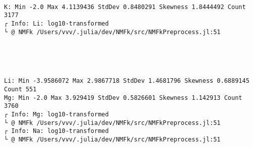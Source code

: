 \documentclass[11pt]{article}
\begin{document}
    \begin{center}
    \end{center}
    { \hspace*{\fill} \\}
    
    \begin{Verbatim}[commandchars=\\\{\}]
K: Min -2.0 Max 4.1139436 StdDev 0.8480291 Skewness 1.8444492 Count 3177
┌ Info: Li: log10-transformed
└ @ NMFk /Users/vvv/.julia/dev/NMFk/src/NMFkPreprocess.jl:51
    \end{Verbatim}

    \begin{center}
    \end{center}
    { \hspace*{\fill} \\}
    
    \begin{center}
    \end{center}
    { \hspace*{\fill} \\}
    
    \begin{Verbatim}[commandchars=\\\{\}]
Li: Min -3.9586072 Max 2.9867718 StdDev 1.4681796 Skewness 0.6889145 Count 551
Mg: Min -2.0 Max 3.929419 StdDev 0.5826601 Skewness 1.142913 Count 3760
┌ Info: Mg: log10-transformed
└ @ NMFk /Users/vvv/.julia/dev/NMFk/src/NMFkPreprocess.jl:51
┌ Info: Na: log10-transformed
└ @ NMFk /Users/vvv/.julia/dev/NMFk/src/NMFkPreprocess.jl:51
    \end{Verbatim}

    \begin{center}
    \end{center}
    { \hspace*{\fill} \\}
    
\end{document}
